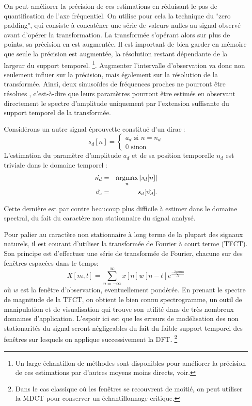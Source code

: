 On peut améliorer la précision de ces estimations en réduisant le pas de quantification de l'axe fréquentiel. On utilise pour cela la technique du "zero padding", qui consiste à concaténer une série de valeurs nulles au signal observé avant d'opérer la transformation. La transformée s'opérant alors sur plus de points, sa précision en est augmentée. Il est important de bien garder en mémoire que seule la précision est augmentée, la résolution restant dépendante de la largeur du support temporel. \footnote{Un large échantillon de méthodes sont disponibles pour améliorer la précision de ces estimations par d'autres moyens moins directs, voir\cite{marchand}.}. Augmenter l'intervalle d'observation va donc non seulement influer sur la précision, mais également sur la résolution de la transformée. Ainsi, deux sinusoïdes de fréquences proches ne pourront être \og résolues \fg, c'est-à-dire que leurs paramètres pourront être estimés en observant directement le spectre d'amplitude uniquement par l'extension suffisante du support temporel de la transformée.


Considérons un autre signal \og éprouvette \fg constitué d'un dirac :
\begin{equation}
  s_d[n] = \begin{cases}
    a_d \text{ si } n=n_d \\
    0 \text{ sinon}
\end{cases}
\end{equation}
L'estimation du paramètre d'amplitude $a_d$ et de sa position temporelle $n_d$ est triviale dans le domaine temporel :
\begin{eqnarray}
  \hat{n_d} &=&  \operatorname*{argmax}_n | s_d[n] | \\
  \hat{a_s} &=&  s_d[\hat{n_d}].
\end{eqnarray}

Cette dernière est par contre beaucoup plus difficile à estimer dans le domaine spectral, du fait du caractère non stationnaire du signal analysé.

Pour palier au caractère non stationnaire à long terme de la plupart des signaux naturels, il est courant d'utiliser la transformée de Fourier à court terme (TFCT). Son principe est d'effectuer une série de transformée de Fourier, chacune sur des fenêtres espacées dans le temps:
\begin{equation}
X[m, t] = \sum_{n = - \infty}^{\infty} x[n] w[n-t] e^{\frac{-2 j  \pi m n}{N}}
\end{equation}
où $w$ est la fenêtre d'observation, eventuellement pondérée.
En prenant le spectre de magnitude de la TFCT, on obtient le bien connu spectrogramme, un outil de manipulation et de visualisation qui trouve son utilité dans de très nombreux domaines d'application. L'espoir ici est que les erreurs de modélisation des non stationarités du signal seront négligeables du fait du faible support temporel des fenêtres sur lesquels on applique successivement la DFT. \footnote{Dans le cas classique où les fenêtres se recouvrent de moitié, on peut utiliser la MDCT pour conserver un échantillonnage critique\cite{princen1986analysis}.}

